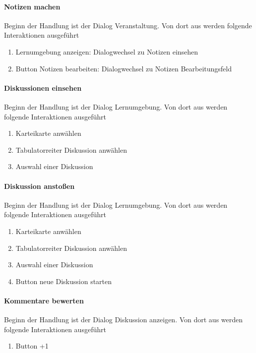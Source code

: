 \documentclass[12pt,a4paper]{article}
\begin{document}
{\paragraph{Notizen machen}
Beginn der Handlung ist der Dialog \glqq Veranstaltung\grqq. Von dort aus werden folgende Interaktionen ausgeführt
\begin{enumerate}
\item \glqq Lernumgebung anzeigen\grqq: Dialogwechsel zu \glqq Notizen einsehen\grqq
\item \glqq Button Notizen bearbeiten\grqq: Dialogwechsel zu \glqq Notizen Bearbeitungsfeld\grqq
\end{enumerate}

\paragraph{Diskussionen einsehen}
Beginn der Handlung ist der Dialog \glqq Lernumgebung\grqq. Von dort aus werden folgende Interaktionen ausgeführt
\begin{enumerate}
\item \glqq Karteikarte anwählen\grqq
\item \glqq Tabulatorreiter Diskussion anwählen\grqq
\item \glqq Auswahl einer Diskussion\grqq
\end{enumerate}

\paragraph{Diskussion anstoßen}
Beginn der Handlung ist der Dialog \glqq Lernumgebung\grqq. Von dort aus werden folgende Interaktionen ausgeführt
\begin{enumerate}
\item \glqq Karteikarte anwählen\grqq
\item \glqq Tabulatorreiter Diskussion anwählen\grqq
\item \glqq Auswahl einer Diskussion\grqq
\item \glqq Button neue Diskussion starten\grqq
\end{enumerate}

\paragraph{Kommentare bewerten}
Beginn der Handlung ist der Dialog \glqq Diskussion anzeigen\grqq. Von dort aus werden folgende Interaktionen ausgeführt
\begin{enumerate}
\item \glqq Button +1\grqq
\end{enumerate}

}
\end{document}
